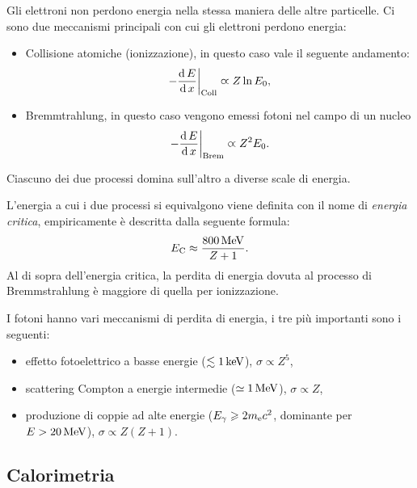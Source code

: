 Gli elettroni non perdono energia nella stessa maniera delle altre particelle. Ci sono due meccanismi principali con cui gli elettroni perdono energia:
\begin{itemize}
    \item Collisione atomiche (ionizzazione), in questo caso vale il seguente andamento:
    \begin{equation*}
        -\frac{\operatorname{d} E}{\operatorname{d} x} \biggr|_\textup{Coll} \varpropto Z \ln E_0,
    \end{equation*}
    \item Bremmtrahlung, in questo caso vengono emessi fotoni nel campo di un nucleo
    \begin{equation*}
        -\frac{\operatorname{d} E}{\operatorname{d} x} \biggr|_\textup{Brem} \varpropto Z^2 E_0.
    \end{equation*}
\end{itemize}
Ciascuno dei due processi domina sull'altro a diverse scale di energia.
\begin{definition}
    L'energia a cui i due processi si equivalgono viene definita con il nome di \emph{energia critica}, empiricamente è descritta dalla seguente formula:
    \begin{equation*}
        E_\textup{C} \approx \frac{800\,\textup{MeV}}{Z + 1}.
    \end{equation*}
    Al di sopra dell'energia critica, la perdita di energia dovuta al processo di Bremmstrahlung è maggiore di quella per ionizzazione.
\end{definition}

I fotoni hanno vari meccanismi di perdita di energia, i tre più importanti sono i seguenti:
\begin{itemize}
    \item effetto fotoelettrico a basse energie ($\lesssim 1\,\textup{keV}$), $\sigma \varpropto Z^5$,
    \item scattering Compton a energie intermedie ($\simeq 1\,\textup{MeV}$), $\sigma \varpropto Z$,
    \item produzione di coppie ad alte energie ($E_\gamma \geqslant 2m_\textup{e}c^2$, dominante per $E > 20\,\textup{MeV}$), $\sigma \varpropto Z(Z+1)$.
\end{itemize}

\subsection*{Calorimetria}

